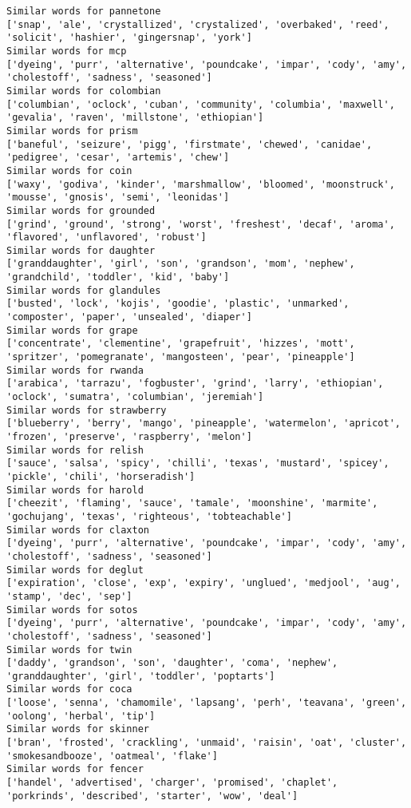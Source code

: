 \documentclass[11pt]{article}
\begin{document}
\begin{Verbatim}[commandchars=\\\{\}]
Similar words for pannetone
['snap', 'ale', 'crystallized', 'crystalized', 'overbaked', 'reed', 'solicit', 'hashier', 'gingersnap', 'york']
Similar words for mcp
['dyeing', 'purr', 'alternative', 'poundcake', 'impar', 'cody', 'amy', 'cholestoff', 'sadness', 'seasoned']
Similar words for colombian
['columbian', 'oclock', 'cuban', 'community', 'columbia', 'maxwell', 'gevalia', 'raven', 'millstone', 'ethiopian']
Similar words for prism
['baneful', 'seizure', 'pigg', 'firstmate', 'chewed', 'canidae', 'pedigree', 'cesar', 'artemis', 'chew']
Similar words for coin
['waxy', 'godiva', 'kinder', 'marshmallow', 'bloomed', 'moonstruck', 'mousse', 'gnosis', 'semi', 'leonidas']
Similar words for grounded
['grind', 'ground', 'strong', 'worst', 'freshest', 'decaf', 'aroma', 'flavored', 'unflavored', 'robust']
Similar words for daughter
['granddaughter', 'girl', 'son', 'grandson', 'mom', 'nephew', 'grandchild', 'toddler', 'kid', 'baby']
Similar words for glandules
['busted', 'lock', 'kojis', 'goodie', 'plastic', 'unmarked', 'composter', 'paper', 'unsealed', 'diaper']
Similar words for grape
['concentrate', 'clementine', 'grapefruit', 'hizzes', 'mott', 'spritzer', 'pomegranate', 'mangosteen', 'pear', 'pineapple']
Similar words for rwanda
['arabica', 'tarrazu', 'fogbuster', 'grind', 'larry', 'ethiopian', 'oclock', 'sumatra', 'columbian', 'jeremiah']
Similar words for strawberry
['blueberry', 'berry', 'mango', 'pineapple', 'watermelon', 'apricot', 'frozen', 'preserve', 'raspberry', 'melon']
Similar words for relish
['sauce', 'salsa', 'spicy', 'chilli', 'texas', 'mustard', 'spicey', 'pickle', 'chili', 'horseradish']
Similar words for harold
['cheezit', 'flaming', 'sauce', 'tamale', 'moonshine', 'marmite', 'gochujang', 'texas', 'righteous', 'tobteachable']
Similar words for claxton
['dyeing', 'purr', 'alternative', 'poundcake', 'impar', 'cody', 'amy', 'cholestoff', 'sadness', 'seasoned']
Similar words for deglut
['expiration', 'close', 'exp', 'expiry', 'unglued', 'medjool', 'aug', 'stamp', 'dec', 'sep']
Similar words for sotos
['dyeing', 'purr', 'alternative', 'poundcake', 'impar', 'cody', 'amy', 'cholestoff', 'sadness', 'seasoned']
Similar words for twin
['daddy', 'grandson', 'son', 'daughter', 'coma', 'nephew', 'granddaughter', 'girl', 'toddler', 'poptarts']
Similar words for coca
['loose', 'senna', 'chamomile', 'lapsang', 'perh', 'teavana', 'green', 'oolong', 'herbal', 'tip']
Similar words for skinner
['bran', 'frosted', 'crackling', 'unmaid', 'raisin', 'oat', 'cluster', 'smokesandbooze', 'oatmeal', 'flake']
Similar words for fencer
['handel', 'advertised', 'charger', 'promised', 'chaplet', 'porkrinds', 'described', 'starter', 'wow', 'deal']

\end{Verbatim}
\end{document}
